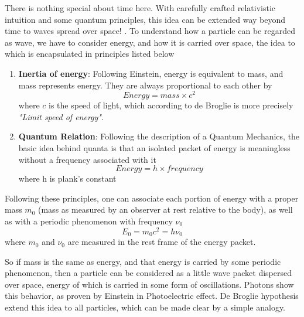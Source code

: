 \documentclass[11pt, a4paper]{article}
\begin{document}
There is nothing special about time here. With carefully crafted relativistic intuition and some quantum principles, this idea can be extended way beyond time to waves spread over space! \cite{de_broglie_thesis}. To understand how a particle can be regarded as wave, we have to consider energy, and how it is carried over space, the idea to which is encapsulated in principles listed below
\begin{enumerate}
	\item \textbf{Inertia of energy}: Following Einstein, energy is equivalent to mass, and mass represents energy. They are always proportional to each other by
	\begin{equation*}
		Energy = mass \times c^{2}
	\end{equation*}
	where $c$ is the speed of light, which according to de Broglie is more precisely \textit{"Limit speed of energy"}.
	\item \textbf{Quantum Relation}: Following the description of a Quantum Mechanics, the basic idea behind quanta is that an isolated packet of energy is meaningless without a frequency associated with it
	\begin{equation*}
		Energy = h \times frequency
	\end{equation*}
	where h is plank's constant
\end{enumerate}
Following these principles, one can associate each portion of energy with a proper mass $m_{0}$ (mass as measured by an observer at rest relative to the body), as well as with a periodic phenomenon with frequency $\nu_{0}$ 
\begin{equation*}
	E_{0} = m_{0}c^{2} = h \nu_{0}
\end{equation*}
where $m_{0}$ and $\nu_{0}$ are measured in the rest frame of the energy packet.

So if mass is the same as energy, and that energy is carried by some periodic phenomenon, then a particle can be considered as a little wave packet dispersed over space, energy of which is carried in some form of oscillations. Photons show this behavior, as proven by Einstein in Photoelectric effect. De Broglie hypothesis extend this idea to all particles, which can be made clear by a simple analogy.
\end{document}
